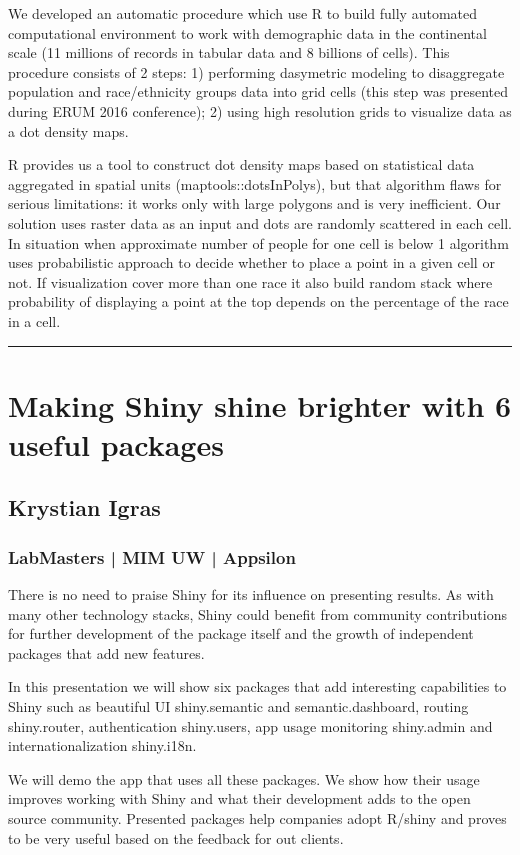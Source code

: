 \documentclass [12pt]{article}
\begin{document}
We developed an automatic procedure which use R to build fully automated computational environment to work with demographic data in the continental scale (11 millions of records in tabular data and 8 billions of cells). This procedure consists of 2 steps: 1) performing dasymetric modeling to disaggregate population and race/ethnicity groups data into grid cells (this step was presented during ERUM 2016 conference); 2) using high resolution grids to visualize data as a dot density maps.

R provides us a tool to construct dot density maps based on statistical data aggregated in spatial units (maptools::dotsInPolys), but that algorithm flaws for serious limitations: it works only with large polygons and is very inefficient. Our solution uses raster data as an input and dots are randomly scattered in each cell. In situation when approximate number of people for one cell is below 1 algorithm uses probabilistic approach to decide whether to place a point in a given cell or not. If visualization cover more than one race it also build random stack where probability of displaying a point at the top depends on the percentage of the race in a cell.

\noindent\rule{\textwidth}{1pt}
\section{Making Shiny shine brighter with 6 useful packages}
\subsection*{Krystian	Igras}
\subsubsection*{LabMasters | MIM UW | Appsilon}

There is no need to praise Shiny for its influence on presenting results. As with many other technology stacks, Shiny could benefit from community contributions for further development of the package itself and the growth of independent packages that add new features.

In this presentation we will show six packages that add interesting capabilities to Shiny such as beautiful UI shiny.semantic and semantic.dashboard, routing shiny.router, authentication shiny.users, app usage monitoring shiny.admin and internationalization shiny.i18n.

We will demo the app that uses all these packages. We show how their usage improves working with Shiny and what their development adds to the open source community. Presented packages help companies adopt R/shiny and proves to be very useful based on the feedback for out clients.
\end{document}
